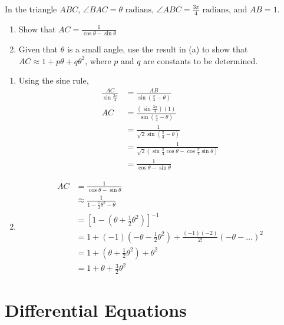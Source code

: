 \documentclass[11pt,a4paper]{book}
\begin{document}
\newpage

\begin{example}

In the triangle $ABC$, $\angle BAC=\theta\text{ radians}$, ${\displaystyle \angle ABC=\frac{3\pi}{4}\text{ radians}}$,
and $AB=1$. \begin{enumerate}[label=(\roman*)]
\item Show that ${\displaystyle AC=\frac{1}{\cos\theta-\sin\theta}}$
\item Given that $\theta$ is a small angle, use the result in (a) to show that $AC\approx1+p\theta+q\theta^{2}$, where $p$ and $q$ are constants to be determined.
\end{enumerate}

\Solution


\begin{enumerate}[label=(\alph*)]
\item Using the sine rule,
\begin{align*}
\frac{AC}{\sin\frac{3\pi}{4}} & =\frac{AB}{\sin\left(\frac{\pi}{4}-\theta\right)}\\
AC & =\frac{\left(\sin\frac{3\pi}{4}\right)\left(1\right)}{\sin\left(\frac{\pi}{4}-\theta\right)}\\
 & =\frac{1}{\sqrt{2}\sin\left(\frac{\pi}{4}-\theta\right)}\\
 & =\frac{1}{\sqrt{2}\left(\sin\frac{\pi}{4}\cos\theta-\cos\frac{\pi}{4}\sin\theta\right)}\\
 & =\frac{1}{\cos\theta-\sin\theta}
\end{align*}

\item
\begin{align*}
AC & =\frac{1}{\cos\theta-\sin\theta}\\
 & \approx\frac{1}{1-\frac{1}{2}\theta^{2}-\theta}\\
 & =\left[1-\left(\theta+\frac{1}{2}\theta^{2}\right)\right]^{-1}\\
 & =1+\left(-1\right)\left(-\theta-\frac{1}{2}\theta^{2}\right)+\frac{\left(-1\right)\left(-2\right)}{2!}\left(-\theta-\ldots\right)^{2}\\
 & =1+\left(\theta+\frac{1}{2}\theta^{2}\right)+\theta^{2}\\
 & =1+\theta+\frac{3}{2}\theta^{2}
\end{align*}
\end{enumerate}

\end{example}


\chapter{Differential Equations}
\end{document}

